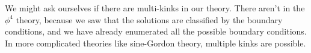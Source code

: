 \documentclass[a4paper]{article}
\begin{document}
%
%
%
%
%
%
%

We might ask ourselves if there are multi-kinks in our theory. There aren't in the $\phi^4$ theory, because we saw that the solutions are classified by the boundary conditions, and we have already enumerated all the possible boundary conditions. In more complicated theories like sine-Gordon theory, multiple kinks are possible.
\end{document}
